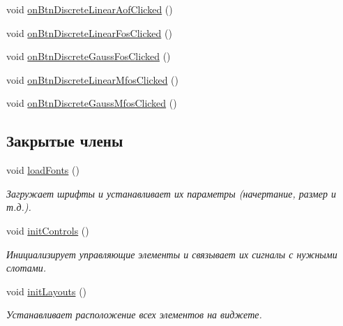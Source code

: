 \begin{DoxyCompactItemize}
\item 
void \hyperlink{class_filter_start_buttons_box_ac9e49cc4f6c8d9712c807e1b0711f67a}{on\+Btn\+Discrete\+Linear\+Aof\+Clicked} ()
\item 
void \hyperlink{class_filter_start_buttons_box_abca20b7c058a4305904912a8e9ea87db}{on\+Btn\+Discrete\+Linear\+Fos\+Clicked} ()
\item 
void \hyperlink{class_filter_start_buttons_box_a0285f32777c968c369c25c91940837d0}{on\+Btn\+Discrete\+Gauss\+Fos\+Clicked} ()
\item 
void \hyperlink{class_filter_start_buttons_box_ac200f7d204677620288463458a0d5dea}{on\+Btn\+Discrete\+Linear\+Mfos\+Clicked} ()
\item 
void \hyperlink{class_filter_start_buttons_box_adbba7359eb2dd93c889c62665f5f70c2}{on\+Btn\+Discrete\+Gauss\+Mfos\+Clicked} ()
\end{DoxyCompactItemize}

\subsection*{Закрытые члены}
\begin{DoxyCompactItemize}
\item 
void \hyperlink{class_filter_start_buttons_box_ae3a208f9857ce99c02506e4005f71a60}{load\+Fonts} ()
\begin{DoxyCompactList}\small\item\em Загружает шрифты и устанавливает их параметры (начертание, размер и т.\+д.). \end{DoxyCompactList}\item 
\hypertarget{class_filter_start_buttons_box_a8803e94f68319169bbaeca632d07f9ff}{}\label{class_filter_start_buttons_box_a8803e94f68319169bbaeca632d07f9ff} 
void \hyperlink{class_filter_start_buttons_box_a8803e94f68319169bbaeca632d07f9ff}{init\+Controls} ()
\begin{DoxyCompactList}\small\item\em Инициализирует управляющие элементы и связывает их сигналы с нужными слотами. \end{DoxyCompactList}\item 
\hypertarget{class_filter_start_buttons_box_afe5d665350bff81aa8f2549fc2e26144}{}\label{class_filter_start_buttons_box_afe5d665350bff81aa8f2549fc2e26144} 
void \hyperlink{class_filter_start_buttons_box_afe5d665350bff81aa8f2549fc2e26144}{init\+Layouts} ()
\begin{DoxyCompactList}\small\item\em Устанавливает расположение всех элементов на виджете. \end{DoxyCompactList}\end{DoxyCompactItemize}
